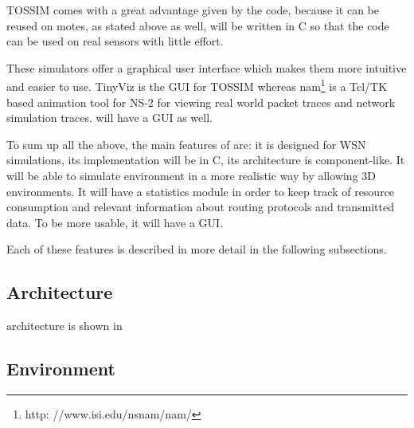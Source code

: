 TOSSIM comes with a great advantage given by the code, because it can be reused on motes,
as stated above as well, \codename will be written in C so that the code can be
used on real sensors with little effort.   

These simulators offer a graphical user interface which makes them more intuitive
and easier to use. TinyViz is the GUI for TOSSIM whereas nam\footnote{http:
//www.isi.edu/nsnam/nam/} is a Tcl/TK based
animation tool for NS-2 for viewing real world packet traces and network simulation
traces. \codename will have a GUI as well.

To sum up all the above, the main features of \codename are: it is designed for WSN simulations, 
its implementation will be in C, its architecture is component-like. It will be able to simulate
environment in a more realistic way by allowing 3D environments. It will have a statistics module
in order to keep track of resource consumption and relevant information about routing protocols
and transmitted data. To be more usable, it will have a GUI. 

Each of these features is described in more detail in the following subsections.

\subsection{Architecture}
\codename architecture is shown in 

\subsection{Environment}

